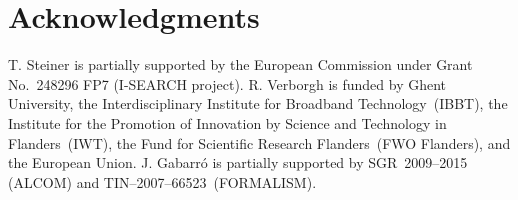 \documentclass[runningheads,a4paper]{llncs}
\begin{document}
\section*{Acknowledgments}
T. Steiner is partially supported by the European Commission
under Grant No.~248296 FP7 (\mbox{I-SEARCH} project).
R. Verborgh is funded by Ghent University,
the Interdisciplinary Institute for Broadband Technology~(\mbox{IBBT}),
the Institute for the Promotion of Innovation by Science and Technology in Flanders~(\mbox{IWT}),
the Fund for Scientific Research Flanders~(\mbox{FWO} Flanders), and the European Union.
J. Gabarr\'o is partially supported by \mbox{SGR}~2009--2015 (\mbox{ALCOM}) and
\mbox{TIN}--2007--66523~(\mbox{FORMALISM}).



\end{document}
